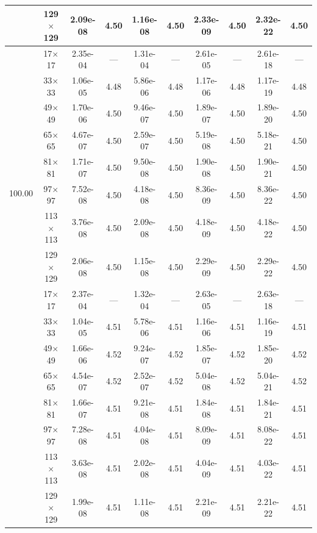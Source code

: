 \begin{table}[H]
{\begin{tabular*}{\textwidth}{@{\extracolsep\fill}c|c|cc|cc|cc|cc@{}}
                & 129$\times$129 & 2.09e-08 & 4.50 & 1.16e-08 & 4.50 & 2.33e-09 & 4.50 & 2.32e-22 & 4.50 \\
                \midrule
                \multirow{10}{*}{100.00} & 17$\times$17 & 2.35e-04 & --- & 1.31e-04 & --- & 2.61e-05 & --- & 2.61e-18 & --- \\
                & 33$\times$33 & 1.06e-05 & 4.48 & 5.86e-06 & 4.48 & 1.17e-06 & 4.48 & 1.17e-19 & 4.48 \\
                & 49$\times$49 & 1.70e-06 & 4.50 & 9.46e-07 & 4.50 & 1.89e-07 & 4.50 & 1.89e-20 & 4.50 \\
                & 65$\times$65 & 4.67e-07 & 4.50 & 2.59e-07 & 4.50 & 5.19e-08 & 4.50 & 5.18e-21 & 4.50 \\
                & 81$\times$81 & 1.71e-07 & 4.50 & 9.50e-08 & 4.50 & 1.90e-08 & 4.50 & 1.90e-21 & 4.50 \\
                & 97$\times$97 & 7.52e-08 & 4.50 & 4.18e-08 & 4.50 & 8.36e-09 & 4.50 & 8.36e-22 & 4.50 \\
                & 113$\times$113 & 3.76e-08 & 4.50 & 2.09e-08 & 4.50 & 4.18e-09 & 4.50 & 4.18e-22 & 4.50 \\
                & 129$\times$129 & 2.06e-08 & 4.50 & 1.15e-08 & 4.50 & 2.29e-09 & 4.50 & 2.29e-22 & 4.50 \\
                \midrule
                \multirow{10}{*}{400.00} & 17$\times$17 & 2.37e-04 & --- & 1.32e-04 & --- & 2.63e-05 & --- & 2.63e-18 & --- \\
                & 33$\times$33 & 1.04e-05 & 4.51 & 5.78e-06 & 4.51 & 1.16e-06 & 4.51 & 1.16e-19 & 4.51 \\
                & 49$\times$49 & 1.66e-06 & 4.52 & 9.24e-07 & 4.52 & 1.85e-07 & 4.52 & 1.85e-20 & 4.52 \\
                & 65$\times$65 & 4.54e-07 & 4.52 & 2.52e-07 & 4.52 & 5.04e-08 & 4.52 & 5.04e-21 & 4.52 \\
                & 81$\times$81 & 1.66e-07 & 4.51 & 9.21e-08 & 4.51 & 1.84e-08 & 4.51 & 1.84e-21 & 4.51 \\
                & 97$\times$97 & 7.28e-08 & 4.51 & 4.04e-08 & 4.51 & 8.09e-09 & 4.51 & 8.08e-22 & 4.51 \\
                & 113$\times$113 & 3.63e-08 & 4.51 & 2.02e-08 & 4.51 & 4.04e-09 & 4.51 & 4.03e-22 & 4.51 \\
                & 129$\times$129 & 1.99e-08 & 4.51 & 1.11e-08 & 4.51 & 2.21e-09 & 4.51 & 2.21e-22 & 4.51 \\
                \midrule

\end{tabular*}}
\end{table}
